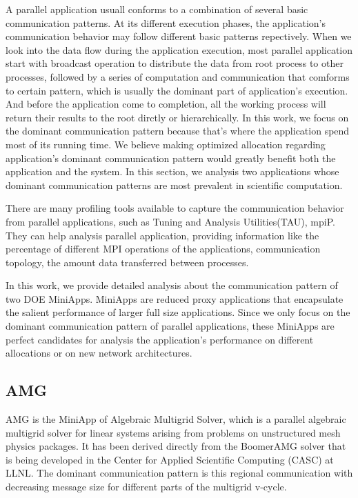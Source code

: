 \documentclass[conference]{IEEEtran}
\begin{document}
A parallel application usuall conforms to a combination of several basic communication patterns. At its different execution phases, the application's communication behavior may follow different basic patterns repectively. When we look into the data flow during the application execution, most parallel application start with broadcast operation to distribute the data from root process to other processes, followed by a series of computation and communication that comforms to certain pattern, which is usually the dominant part of application's execution. And before the application come to completion, all the working process will return their results to the root dirctly or hierarchically. In this work, we focus on the dominant communication pattern because that's where the application spend most of its running time. We believe making optimized allocation regarding application's dominant communication pattern would greatly benefit both the application and the system. In this section, we analysis two applications whose dominant communication patterns are most prevalent in scientific computation.

There are many profiling tools available to capture the communication behavior from parallel applications, such as Tuning and Analysis Utilities(TAU)\cite{tau}, mpiP\cite{mpip}. They can help analysis parallel application, providing information like the percentage of different MPI operations of the applications, communication topology, the amount data transferred between processes.

In this work, we provide detailed analysis about the communication pattern of two DOE MiniApps. MiniApps are reduced proxy applications that encapsulate the salient performance of larger full size applications\cite{miniapp}. Since we only focus on the dominant communication pattern of parallel applications, these MiniApps are perfect candidates for analysis the application's performance on different allocations or on new network architectures.


\subsection{AMG}
\label{sec:amg}
AMG is the MiniApp of Algebraic Multigrid Solver, which is a parallel algebraic multigrid solver for linear systems arising from problems on unstructured mesh physics packages. It has been derived directly from the BoomerAMG solver that is being developed in the Center for Applied Scientific Computing (CASC) at LLNL\cite{amg}. The dominant communication pattern is this regional communication with decreasing message size for different parts of the multigrid v-cycle.
\end{document}
